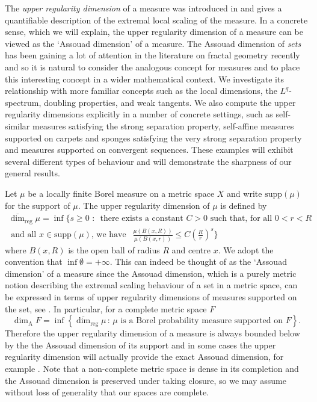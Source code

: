 \documentclass[12pt]{amsart}
\numberwithin{equation}{section}
\renewcommand{\geq}{\geqslant}
\renewcommand{\leq}{\leqslant}
\begin{document}
The \emph{upper regularity dimension} of a  measure was introduced in \cite{anti1,anti2} and gives a quantifiable description of the extremal local scaling of the measure.  In a concrete sense, which we will explain, the upper regularity dimension of a measure can be viewed as the `Assouad dimension' of a measure.  The Assouad dimension of \emph{sets} has been gaining a lot of attention in the literature on fractal geometry recently and so it is natural to consider the analogous concept for measures and to place this interesting concept in a wider mathematical context. We investigate its relationship with more familiar concepts such as the local dimensions, the $L^q$-spectrum, doubling properties, and weak tangents. We also compute the upper regularity dimensions explicitly in a number of concrete settings, such as self-similar measures satisfying the strong separation property, self-affine measures supported on carpets and sponges satisfying the very strong separation property and measures supported on convergent sequences.  These examples will exhibit several different types of behaviour and will demonstrate the sharpness of our general results.

Let $\mu$ be a locally finite Borel measure on a metric space $X$ and write $\text{supp}(\mu)$ for the support of $\mu$. The upper regularity dimension of $\mu$ is defined by 
\begin{multline*} 
\overline{\dim}_{\text{reg}} \mu = \inf \Bigg\{ s \geq 0 \, \,  : \,  \text{ there exists a  constant }C  > 0\text{  such that, for all  $0< r< R $} \\ \text{  and all $x \in \text{supp} (\mu)$, we have }  \ \  \frac{\mu(B(x,R))}{\mu(B(x,r))} \leq C\left(\frac{R}{r}\right)^{s} \Bigg\}
\end{multline*}
where $B(x,R)$ is the open ball of radius $R$ and centre $x$.   We adopt the convention that $\inf \emptyset = + \infty$. This can indeed be thought of as the `Assouad dimension' of a measure since the Assouad dimension, which is a purely metric notion describing the extremal scaling behaviour of a set in a metric space, can be expressed in terms of upper regularity dimensions of measures  supported on the set, see \cite{luksak, konyagin}. In particular, for a complete metric space $F$
\[
\dim_{\text{A}} F = \inf \left\{ \overline{\dim}_{\text{reg}} \mu \,  \colon \, \mu \text{ is a Borel probability measure supported on } F\right\}.
\]
Therefore the upper regularity dimension of a measure is always bounded below by the  the Assouad dimension of its support and in some cases the upper regularity dimension will actually provide the exact Assouad dimension, for example \cite[Theorem 2.3]{fraser-howroyd}.  Note that  a non-complete metric space is dense in its completion and the Assouad dimension is preserved under taking closure, so we may assume without loss of generality that our spaces are complete.
\end{document}
